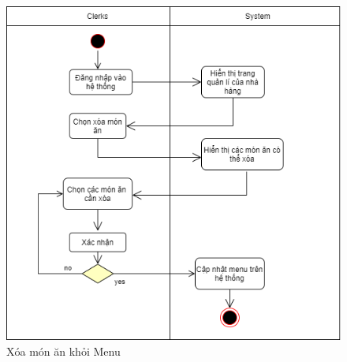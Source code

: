 \begin{figure}[!h]
    \begin{center}
        \includegraphics[scale=0.45]{Images/ActivityDiagram/AD_delete.png}
    \end{center}
    \hspace{0.3cm}
    \caption{Xóa món ăn khỏi Menu}
\end{figure}
\newpage
